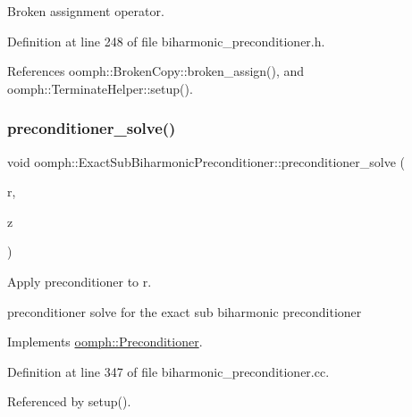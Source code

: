 Broken assignment operator. 



Definition at line 248 of file biharmonic\+\_\+preconditioner.\+h.



References oomph\+::\+Broken\+Copy\+::broken\+\_\+assign(), and oomph\+::\+Terminate\+Helper\+::setup().

\mbox{\label{classoomph_1_1ExactSubBiharmonicPreconditioner_aaf4493aaa8dcd46cf585b7585d246ad0}} 
\subsubsection{\texorpdfstring{preconditioner\+\_\+solve()}{preconditioner\_solve()}}
{\footnotesize\ttfamily void oomph\+::\+Exact\+Sub\+Biharmonic\+Preconditioner\+::preconditioner\+\_\+solve (\begin{DoxyParamCaption}\item[{const \hyperlink{classoomph_1_1DoubleVector}{Double\+Vector} \&}]{r,  }\item[{\hyperlink{classoomph_1_1DoubleVector}{Double\+Vector} \&}]{z }\end{DoxyParamCaption})\hspace{0.3cm}{\ttfamily [virtual]}}



Apply preconditioner to r. 

preconditioner solve for the exact sub biharmonic preconditioner 

Implements \hyperlink{classoomph_1_1Preconditioner_ace1199369e4465cd2b9a34884bb64ec8}{oomph\+::\+Preconditioner}.



Definition at line 347 of file biharmonic\+\_\+preconditioner.\+cc.



Referenced by setup().

\mbox{\label{classoomph_1_1ExactSubBiharmonicPreconditioner_af2c9a65ab49cdc6dd0b0d5339833c407}} 
